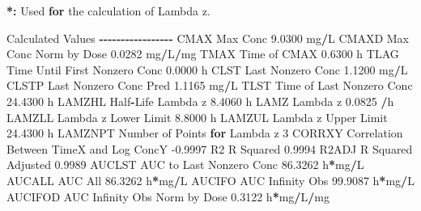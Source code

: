 \documentclass[
  10pt,
]{krantz}
\makeatletter
\newenvironment{Shaded}{\begin{snugshade}}{\end{snugshade}}
\newcommand{\ControlFlowTok}[1]{\textcolor[rgb]{0.13,0.29,0.53}{\textbf{#1}}}
\newcommand{\DecValTok}[1]{\textcolor[rgb]{0.00,0.00,0.81}{#1}}
\newcommand{\ErrorTok}[1]{\textcolor[rgb]{0.64,0.00,0.00}{\textbf{#1}}}
\newcommand{\FloatTok}[1]{\textcolor[rgb]{0.00,0.00,0.81}{#1}}
\newcommand{\NormalTok}[1]{#1}
\newcommand{\OperatorTok}[1]{\textcolor[rgb]{0.81,0.36,0.00}{\textbf{#1}}}
\newcommand{\StringTok}[1]{\textcolor[rgb]{0.31,0.60,0.02}{#1}}
\newenvironment{kframe}{%
\medskip{}
\setlength{\fboxsep}{.8em}
 \def\at@end@of@kframe{}%
 \ifinner\ifhmode%
  \def\at@end@of@kframe{\end{minipage}}%
  \begin{minipage}{\columnwidth}%
 \fi\fi%
 \def\FrameCommand##1{\hskip\@totalleftmargin \hskip-\fboxsep
 \colorbox{shadecolor}{##1}\hskip-\fboxsep
     \hskip-\linewidth \hskip-\@totalleftmargin \hskip\columnwidth}%
 \MakeFramed {\advance\hsize-\width
   \@totalleftmargin\z@ \linewidth\hsize
   \@setminipage}}%
 {\par\unskip\endMakeFramed%
 \at@end@of@kframe}
\renewenvironment{Shaded}{\begin{kframe}}{\end{kframe}}
\makeatother
\begin{document}
\begin{Shaded}
\begin{Highlighting}[]
\OperatorTok{*}\ErrorTok{:}\StringTok{ }\NormalTok{Used }\ControlFlowTok{for}\NormalTok{ the calculation of Lambda z.}


\NormalTok{Calculated Values}
\OperatorTok{{-}{-}{-}{-}{-}{-}{-}{-}{-}{-}{-}{-}{-}{-}{-}{-}{-}}
\NormalTok{CMAX       Max Conc                                        }\FloatTok{9.0300}\NormalTok{ mg}\OperatorTok{/}\NormalTok{L}
\NormalTok{CMAXD      Max Conc Norm by Dose                           }\FloatTok{0.0282}\NormalTok{ mg}\OperatorTok{/}\NormalTok{L}\OperatorTok{/}\NormalTok{mg}
\NormalTok{TMAX       Time of CMAX                                    }\FloatTok{0.6300}\NormalTok{ h}
\NormalTok{TLAG       Time Until First Nonzero Conc                   }\FloatTok{0.0000}\NormalTok{ h}
\NormalTok{CLST       Last Nonzero Conc                               }\FloatTok{1.1200}\NormalTok{ mg}\OperatorTok{/}\NormalTok{L}
\NormalTok{CLSTP      Last Nonzero Conc Pred                          }\FloatTok{1.1165}\NormalTok{ mg}\OperatorTok{/}\NormalTok{L}
\NormalTok{TLST       Time of Last Nonzero Conc                      }\FloatTok{24.4300}\NormalTok{ h}
\NormalTok{LAMZHL     Half}\OperatorTok{{-}}\NormalTok{Life Lambda z                              }\FloatTok{8.4060}\NormalTok{ h}
\NormalTok{LAMZ       Lambda z                                        }\FloatTok{0.0825} \OperatorTok{/}\NormalTok{h}
\NormalTok{LAMZLL     Lambda z Lower Limit                            }\FloatTok{8.8000}\NormalTok{ h}
\NormalTok{LAMZUL     Lambda z Upper Limit                           }\FloatTok{24.4300}\NormalTok{ h}
\NormalTok{LAMZNPT    Number of Points }\ControlFlowTok{for}\NormalTok{ Lambda z                   }\DecValTok{3}
\NormalTok{CORRXY     Correlation Between TimeX and Log ConcY        }\FloatTok{{-}0.9997} 
\NormalTok{R2         R Squared                                       }\FloatTok{0.9994} 
\NormalTok{R2ADJ      R Squared Adjusted                              }\FloatTok{0.9989} 
\NormalTok{AUCLST     AUC to Last Nonzero Conc                       }\FloatTok{86.3262}\NormalTok{ h}\OperatorTok{*}\NormalTok{mg}\OperatorTok{/}\NormalTok{L}
\NormalTok{AUCALL     AUC All                                        }\FloatTok{86.3262}\NormalTok{ h}\OperatorTok{*}\NormalTok{mg}\OperatorTok{/}\NormalTok{L}
\NormalTok{AUCIFO     AUC Infinity Obs                               }\FloatTok{99.9087}\NormalTok{ h}\OperatorTok{*}\NormalTok{mg}\OperatorTok{/}\NormalTok{L}
\NormalTok{AUCIFOD    AUC Infinity Obs Norm by Dose                   }\FloatTok{0.3122}\NormalTok{ h}\OperatorTok{*}\NormalTok{mg}\OperatorTok{/}\NormalTok{L}\OperatorTok{/}\NormalTok{mg}

\end{Highlighting}
\end{Shaded}
\end{document}
